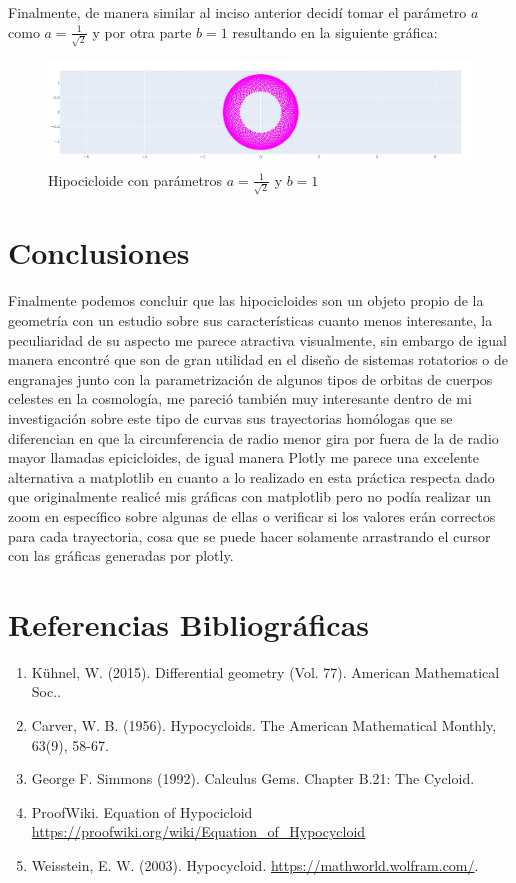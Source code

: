 \documentclass[letterpaper,11pt,dvipsnames]{article}
\begin{document}
Finalmente, de manera similar al inciso anterior decidí tomar el parámetro $a$ como $a=\frac{1}{\sqrt{2}}$ y por otra parte $b=1$ resultando en la siguiente gráfica:
\begin{figure}[H]
    \centering
    \includegraphics[scale=0.4]{grafica8.jpg}
    \caption{Hipocicloide con parámetros $a=\frac{1}{\sqrt{2}}$ y $b=1$ }
    \label{fig:sample}
\end{figure}
\section{Conclusiones} 

Finalmente podemos concluir que las hipocicloides son un objeto propio de la geometría con un estudio sobre sus características cuanto menos interesante, la peculiaridad de su aspecto me parece atractiva visualmente, sin embargo de igual manera encontré que son de gran utilidad en el diseño de sistemas rotatorios o de engranajes junto con la parametrización de algunos tipos de orbitas de cuerpos celestes en la cosmología, me pareció también muy interesante dentro de mi investigación sobre este tipo de curvas sus trayectorias homólogas que se diferencian en que la circunferencia de radio menor gira por fuera de la de radio mayor llamadas epicicloides, de igual manera Plotly me parece una excelente alternativa a matplotlib en cuanto a lo realizado en esta práctica respecta dado que originalmente realicé mis gráficas con matplotlib pero no podía realizar un zoom en específico sobre algunas de ellas o verificar si los valores erán correctos para cada trayectoria, cosa que se puede hacer solamente arrastrando el cursor con las gráficas generadas por plotly.
\newpage
\section*{Referencias Bibliográficas}
\begin{enumerate}
    \item Kühnel, W. (2015). Differential geometry (Vol. 77). American Mathematical Soc..
    \item Carver, W. B. (1956). Hypocycloids. The American Mathematical Monthly, 63(9), 58-67.
    \item George F. Simmons (1992). Calculus Gems. Chapter B.21: The Cycloid.
    \item ProofWiki. Equation of Hypocicloid \url{https://proofwiki.org/wiki/Equation_of_Hypocycloid}
    \item Weisstein, E. W. (2003). Hypocycloid. \url{https://mathworld.wolfram.com/}.
    
\end{enumerate}
\end{document}
